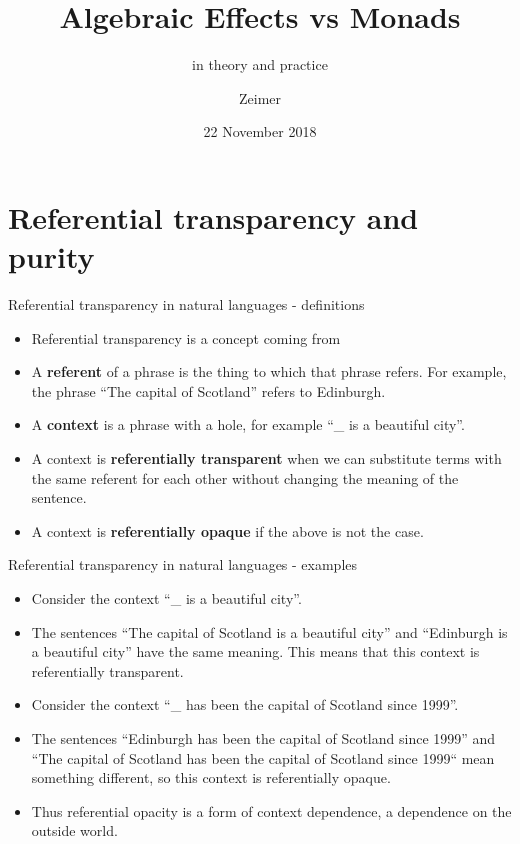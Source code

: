 \documentclass{beamer}
\title{Algebraic Effects vs Monads}
\subtitle{in theory and practice}
\author{Zeimer}
\date{22 November 2018}
\newcommand{\link}[2]{\href{#2}{\color{blue}{#1}}}
\begin{document}
\frame{\titlepage}

\frame{\tableofcontents}

\section{Referential transparency and purity}

\begin{frame}{Referential transparency in natural languages - definitions}
\begin{itemize}
	\item Referential transparency is a concept coming from \link{analytic philosophy}{https://en.wikipedia.org/wiki/Analytic_philosophy}
	\item A \textbf{referent} of a phrase is the thing to which that phrase refers. For example, the phrase ``The capital of Scotland'' refers to Edinburgh.
	\item A \textbf{context} is a phrase with a hole, for example ``\_ is a beautiful city''.
	\item A context is \textbf{referentially transparent} when we can substitute terms with the same referent for each other without changing the meaning of the sentence.
	\item A context is \textbf{referentially opaque} if the above is not the case.
\end{itemize}
\end{frame}

\begin{frame}{Referential transparency in natural languages - examples}
\begin{itemize}
	\item Consider the context ``\_ is a beautiful city''.
	\item The sentences ``The capital of Scotland is a beautiful city'' and ``Edinburgh is a beautiful city'' have the same meaning. This means that this context is referentially transparent.
	\item Consider the context ``\_ has been the capital of Scotland since 1999''.
	\item The sentences ``Edinburgh has been the capital of Scotland since 1999'' and ``The capital of Scotland has been the capital of Scotland since 1999`` mean something different, so this context is referentially opaque.
	\item Thus referential opacity is a form of context dependence, a dependence on the outside world.
\end{itemize}
\end{frame}
\end{document}
